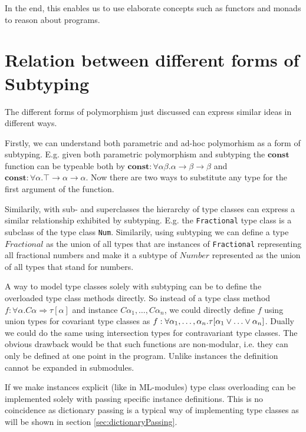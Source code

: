In the end, this enables us to use elaborate concepts such as functors and monads to reason about programs. 


\section{Relation between different forms of Subtyping}\label{sec:relations}

The different forms of polymorphism just discussed can express similar ideas in different ways. 

Firstly, we can understand both parametric and ad-hoc polymorhism as a form of subtyping.
E.g. given both parametric polymorphism and subtyping the $\mathbf{const}$ function can be typeable both by
$\mathbf{const} : \forall \alpha \beta. \alpha \to \beta \to \beta$ and $\mathbf{const} : \forall \alpha. \top \to \alpha \to \alpha$.
Now there are two ways to substitute any type for the first argument of the function.

Similarily, with sub- and superclasses the hierarchy of type classes can express a similar relationship exhibited by subtyping.
E.g. the \texttt{Fractional} type class is a subclass of the type class \texttt{Num}.
Similarily, using subtyping we can define a type $\mathit{Fractional}$ as the union of all types that are instances of \texttt{Fractional} representing all fractional numbers and make it a subtype of $\mathit{Number}$ represented as the union of all types that stand for numbers.

A way to model type classes solely with subtyping can be to define the overloaded type class methods directly.
So instead of a type class method $f : \forall \alpha. C \alpha \Rightarrow \tau[\alpha]$ and instance $C \alpha_1, \dots, C \alpha_n$,
we could directly define $f$ using union types for covariant type classes as $f : \forall \alpha_1,\dots,\alpha_n. \tau[\alpha_1 \join \dots \join \alpha_n]$.
Dually we could do the same using intersection types for contravariant type classes.
The obvious drawback would be that such functions are non-modular, i.e. they can only be defined at one point in the program.
Unlike instances the definition cannot be expanded in submodules.

If we make instances explicit (like in ML-modules) type class overloading can be implemented solely with passing specific instance definitions.
This is no coincidence as dictionary passing is a typical way of implementing type classes as will be shown in section \ref{sec:dictionaryPassing}.

